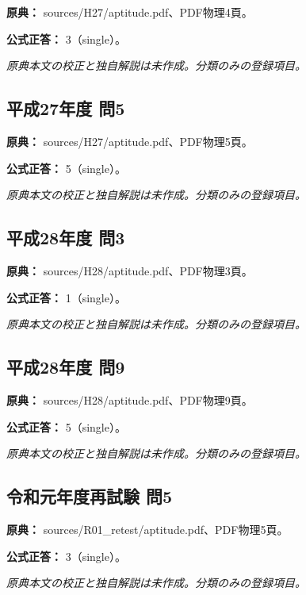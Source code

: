 \noindent\textbf{原典：} sources/H27/aptitude.pdf、PDF物理4頁。

\textbf{公式正答：} 3（single）。

\par\textit{原典本文の校正と独自解説は未作成。分類のみの登録項目。}

\subsection{平成27年度 問5}
\label{q:h27-reg-apt-05}

\noindent\textbf{原典：} sources/H27/aptitude.pdf、PDF物理5頁。

\textbf{公式正答：} 5（single）。

\par\textit{原典本文の校正と独自解説は未作成。分類のみの登録項目。}

\subsection{平成28年度 問3}
\label{q:h28-reg-apt-03}

\noindent\textbf{原典：} sources/H28/aptitude.pdf、PDF物理3頁。

\textbf{公式正答：} 1（single）。

\par\textit{原典本文の校正と独自解説は未作成。分類のみの登録項目。}

\subsection{平成28年度 問9}
\label{q:h28-reg-apt-09}

\noindent\textbf{原典：} sources/H28/aptitude.pdf、PDF物理9頁。

\textbf{公式正答：} 5（single）。

\par\textit{原典本文の校正と独自解説は未作成。分類のみの登録項目。}

\subsection{令和元年度再試験 問5}
\label{q:r01-ret-apt-05}

\noindent\textbf{原典：} sources/R01\_retest/aptitude.pdf、PDF物理5頁。

\textbf{公式正答：} 3（single）。

\par\textit{原典本文の校正と独自解説は未作成。分類のみの登録項目。}

